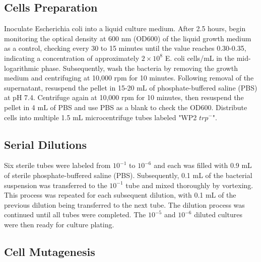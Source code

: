 \documentclass[a4paper,10pt]{article}
\begin{document}
\begin{multicols}{2}
\subsection{Cells Preparation}
Inoculate Escherichia coli into a liquid culture medium. After 2.5 hours, begin monitoring the optical density at 600 nm (OD600) of the liquid growth medium as a control, checking every 30 to 15 minutes until the value reaches 0.30-0.35, indicating a concentration of approximately $2\times 10^8$ E. coli cells/mL in the mid-logarithmic phase. Subsequently, wash the bacteria by removing the growth medium and centrifuging at 10,000 rpm for 10 minutes. Following removal of the supernatant, resuspend the pellet in 15-20 mL of phosphate-buffered saline (PBS) at pH 7.4. Centrifuge again at 10,000 rpm for 10 minutes, then resuspend the pellet in 4 mL of PBS and use PBS as a blank to check the OD600. Distribute cells into multiple 1.5 mL microcentrifuge tubes labeled "WP2 $trp^-$".


\subsection{Serial Dilutions}
Six sterile tubes were labeled from $10^{-1}$ to $10^{-6}$ and each was filled with 0.9 mL of sterile phosphate-buffered saline (PBS). Subsequently, 0.1 mL of the bacterial suspension was transferred to the $10^{-1}$ tube and mixed thoroughly by vortexing. This process was repeated for each subsequent dilution, with 0.1 mL of the previous dilution being transferred to the next tube. The dilution process was continued until all tubes were completed. The $10^{-5}$ and $10^{-6}$ diluted cultures were then ready for culture plating.


\subsection{Cell Mutagenesis}



\end{multicols}
\end{document}
